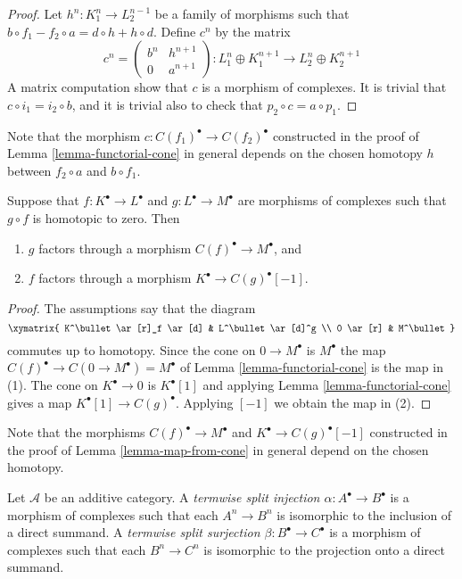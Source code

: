 \begin{proof}
Let $h^n : K_1^n \to L_2^{n - 1}$ be a family of morphisms such that
$b \circ f_1 - f_2 \circ a= d \circ h + h \circ d$.
Define $c^n$ by the matrix
$$
c^n =
\left(
\begin{matrix}
b^n & h^{n + 1} \\
0 & a^{n + 1}
\end{matrix}
\right) :
L_1^n \oplus K_1^{n + 1} \to L_2^n \oplus K_2^{n + 1}
$$
A matrix computation show that $c$ is a morphism of complexes.
It is trivial that $c \circ i_1 = i_2 \circ b$, and it is
trivial also to check that $p_2 \circ c = a \circ p_1$.
\end{proof}

\noindent
Note that the morphism $c : C(f_1)^\bullet \to C(f_2)^\bullet$
constructed in the
proof of Lemma \ref{lemma-functorial-cone} in general depends on the
chosen homotopy $h$ between $f_2 \circ a$ and $b \circ f_1$.

\begin{lemma}
\label{lemma-map-from-cone}
Suppose that $f: K^\bullet \to L^\bullet$ and $g : L^\bullet \to M^\bullet$
are morphisms of complexes such that $g \circ f$ is homotopic to zero.
Then
\begin{enumerate}
\item $g$ factors through a morphism $C(f)^\bullet \to M^\bullet$, and
\item $f$ factors through a morphism $K^\bullet \to C(g)^\bullet[-1]$.
\end{enumerate}
\end{lemma}

\begin{proof}
The assumptions say that the diagram
$$
\xymatrix{
K^\bullet \ar[r]_f \ar[d] & L^\bullet \ar[d]^g \\
0 \ar[r] & M^\bullet
}
$$
commutes up to homotopy.
Since the cone on $0 \to M^\bullet$ is $M^\bullet$ the
map $C(f)^\bullet \to C(0 \to M^\bullet) = M^\bullet$
of Lemma \ref{lemma-functorial-cone}
is the map in (1). The cone on $K^\bullet \to 0$ is
$K^\bullet[1]$ and applying Lemma \ref{lemma-functorial-cone}
gives a map $K^\bullet[1] \to C(g)^\bullet$. Applying
$[-1]$ we obtain the map in (2).
\end{proof}

\noindent
Note that the morphisms $C(f)^\bullet \to M^\bullet$ and
$K^\bullet \to C(g)^\bullet[-1]$ constructed in the proof
of Lemma \ref{lemma-map-from-cone} in general depend on the
chosen homotopy.

\begin{definition}
\label{definition-termwise-split-map}
Let $\mathcal{A}$ be an additive category.
A {\it termwise split injection $\alpha : A^\bullet \to B^\bullet$}
is a morphism of complexes such that each $A^n \to B^n$
is isomorphic to the inclusion of a direct summand.
A {\it termwise split surjection $\beta : B^\bullet \to C^\bullet$}
is a morphism of complexes such that each $B^n \to C^n$
is isomorphic to the projection onto a direct summand.
\end{definition}


